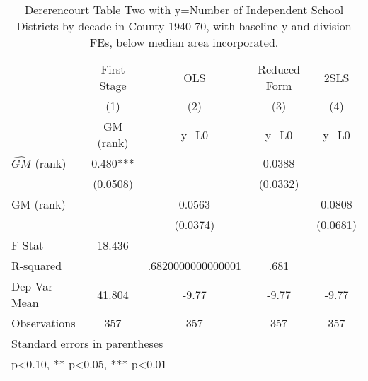 \begin{table}[htbp]\centering
\def\sym#1{\ifmmode^{#1}\else\(^{#1}\)\fi}
\caption{Dererencourt Table Two with y=Number of Independent School Districts by decade in County 1940-70, with baseline y and division FEs, below median area incorporated.}
\begin{tabular}{l*{4}{c}}
\toprule
                    & First Stage   &         OLS   &Reduced Form   &        2SLS   \\
                    &\multicolumn{1}{c}{(1)}&\multicolumn{1}{c}{(2)}&\multicolumn{1}{c}{(3)}&\multicolumn{1}{c}{(4)}\\
                    &\multicolumn{1}{c}{GM  (rank)}&\multicolumn{1}{c}{y\_L0}&\multicolumn{1}{c}{y\_L0}&\multicolumn{1}{c}{y\_L0}\\
\midrule
$\hat{GM}$ (rank)   &       0.480***&               &      0.0388   &               \\
                    &    (0.0508)   &               &    (0.0332)   &               \\
\addlinespace
GM  (rank)          &               &      0.0563   &               &      0.0808   \\
                    &               &    (0.0374)   &               &    (0.0681)   \\
\midrule
F-Stat              &      18.436   &               &               &               \\
R-squared           &               &.6820000000000001   &        .681   &               \\
Dep Var Mean        &      41.804   &       -9.77   &       -9.77   &       -9.77   \\
Observations        &         357   &         357   &         357   &         357   \\
\bottomrule
\multicolumn{5}{l}{\footnotesize Standard errors in parentheses}\\
\multicolumn{5}{l}{\footnotesize * p<0.10, ** p<0.05, *** p<0.01}\\
\end{tabular}
\end{table}
